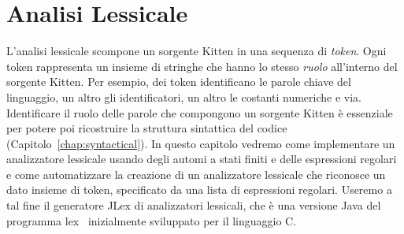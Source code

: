 \chapter{Analisi Lessicale}\label{chap:lexical}
%
\begin{center}
\end{center}
%
L'analisi lessicale scompone un sorgente Kitten in una sequenza di
\emph{token}. Ogni token rappresenta un insieme di stringhe che hanno
lo stesso \emph{ruolo} all'interno del sorgente Kitten. Per esempio, dei token
identificano le parole chiave del linguaggio, un altro gli identificatori, un
altro le costanti
numeriche e \cosi via. Identificare il ruolo delle parole che compongono
un sorgente Kitten \`e essenziale per potere poi ricostruire la struttura
sintattica del codice (Capitolo~\ref{chap:syntactical}).
In questo capitolo vedremo come implementare un analizzatore lessicale
usando degli automi a stati finiti e delle espressioni regolari
e come automatizzare la creazione di un analizzatore lessicale che
riconosce un dato insieme di token, specificato da una lista
di espressioni regolari. Useremo a tal fine il generatore JLex di
analizzatori lessicali, che \`e una versione Java del programma
lex~\cite{Lesk75} inizialmente sviluppato per il linguaggio C.
%
